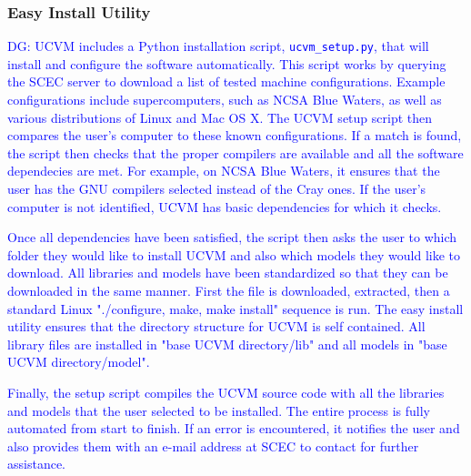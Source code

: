 \subsubsection{Easy Install Utility}
\label{sec:easy.install}

\textcolor{blue}{DG: UCVM includes a Python installation script, \texttt{ucvm\_setup.py}, that will install and configure the software automatically. This script works by querying the SCEC server to download a list of tested machine configurations. Example configurations include supercomputers, such as NCSA Blue Waters, as well as various distributions of Linux and Mac OS X. The UCVM setup script then compares the user's computer to these known configurations. If a match is found, the script then checks that the proper compilers are available and all the software dependecies are met. For example, on NCSA Blue Waters, it ensures that the user has the GNU compilers selected instead of the Cray ones. If the user's computer is not identified, UCVM has basic dependencies for which it checks.}

\textcolor{blue}{Once all dependencies have been satisfied, the script then asks the user to which folder they would like to install UCVM and also which models they would like to download. All libraries and models have been standardized so that they can be downloaded in the same manner. First the file is downloaded, extracted, then a standard Linux "./configure, make, make install" sequence is run. The easy install utility ensures that the directory structure for UCVM is self contained. All library files are installed in "base UCVM directory/lib" and all models in "base UCVM directory/model".}

\textcolor{blue}{Finally, the setup script compiles the UCVM source code with all the libraries and models that the user selected to be installed. The entire process is fully automated from start to finish. If an error is encountered, it notifies the user and also provides them with an e-mail address at SCEC to contact for further assistance.}

